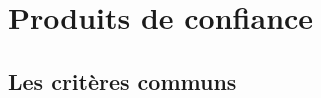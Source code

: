 
\section{Produits de confiance}

\subsection{Les critères communs} \label{chap:ISOCC}

\utodo

\utocomplete

